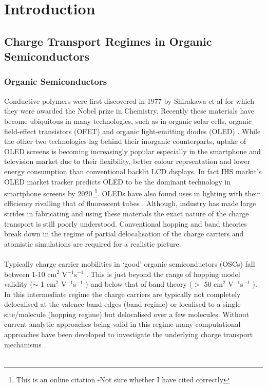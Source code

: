 \chapter{Introduction}
\label{chapterlabel1}
\section{Charge Transport Regimes in Organic Semiconductors}
\subsection{Organic Semiconductors}
Conductive polymers were first discovered in 1977 by Shirakawa et al  \cite{chiang_electrical_1977, Shirakawa1977Jan} for which they were awarded the Nobel prize in Chemistry. Recently these materials have become ubiquitous in many technologies, such as in organic solar cells\cite{Kippelen2009}, organic field-effect transistors (OFET) \cite{Malachowski2010Jun} and organic light-emitting diodes (OLED) \cite{ThejoKalyani2012Jun}. While the other two technologies lag behind their inorganic counterparts, uptake of OLED screens is becoming increasingly popular especially in the smartphone and television market due to their flexibility, better colour reprsentation and lower energy consumption than conventional backlit LCD displays. In fact IHS markit's OLED market tracker predicts OLED to be the dominant technology in smartphone screens by 2020 \cite{IHSMarkit} \footnote{This is an online citation -Not sure whether I have cited correctly}. OLEDs have also found uses in lighting with their efficiency rivalling that of fluorescent tubes \cite{Reineke2009May, OLED_lighting}. Although, industry has made large strides in fabricating and using these materials the exact nature of the charge transport is still poorly understood. Conventional hopping and band theories break down in the regime of partial delocalisation of the charge carriers and atomistic simulations are required for a realistic picture.
\\\\
Typically charge carrier mobilities in `good' organic semiconductors (OSCs) fall between 1-10 cm$^2$ V$^{-1}$s$^{-1}$ \cite{yavuz_dichotomy_2017}. This is just beyond the range of hopping model validity ($\sim $ 1 cm$^2$ V$^{-1}$s$^{-1}$ ) and below that of band theory ($>$ 50 cm$^2$ V$^{-1}$s$^{-1}$ ). In this intermediate regime the charge carriers are typically not completely delocalised at the valence band edges (band regime) or localised to a single site/molecule (hopping regime) but delocalised over a few molecules. Without current analytic approaches being valid in this regime many computational approaches have been developed to investigate the underlying charge transport mechanisms \cite{oberhofer_charge_2017}.
\\\\

